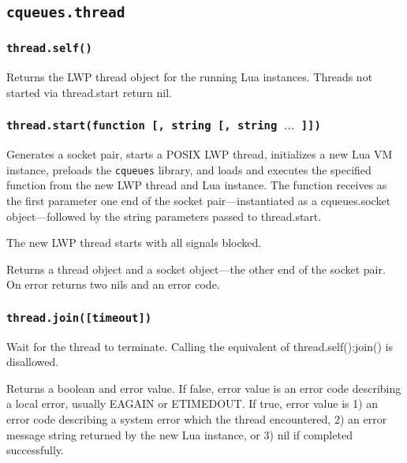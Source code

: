 \documentclass[11pt, oneside]{memoir}
\newcommand*{\cqueues}[0]{\texttt{cqueues}\xspace}
\newcommand*{\fn}[1]{\texttt{#1}\xspace}
\newcommand*{\module}[1]{\texttt{#1}\xspace}
\begin{document}
\subsection{\module{cqueues.thread}}

\subsubsection[\fn{thread.self}]{\fn{thread.self()}}
Returns the LWP thread object for the running Lua instances. Threads not started via thread.start return nil.

\subsubsection[\fn{thread.start}]{\fn{thread.start(function [, string [, string $\ldots$ ]])}}
Generates a socket pair, starts a POSIX LWP thread, initializes a new Lua VM instance, preloads the \cqueues library, and loads and executes the specified function from the new LWP thread and Lua instance. The function receives as the first parameter one end of the socket pair---instantiated as a cqueues.socket object---followed by the string parameters passed to thread.start.

The new LWP thread starts with all signals blocked.

Returns a thread object and a socket object---the other end of the socket pair. On error returns two nils and an error code.

\subsubsection[\fn{thread:join}]{\fn{thread.join([timeout])}}
Wait for the thread to terminate. Calling the equivalent of thread.self():join() is disallowed.

Returns a boolean and error value. If false, error value is an error code describing a local error, usually EAGAIN or ETIMEDOUT. If true, error value is 1) an error code describing a system error which the thread encountered, 2) an error message string returned by the new Lua instance, or 3) nil if completed successfully.


\appendix
\printindex
\end{document}
